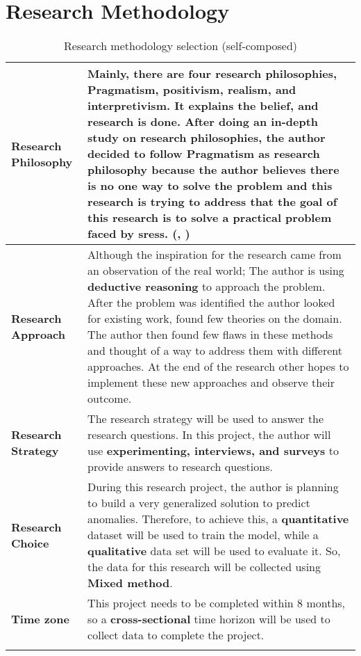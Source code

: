 \section{Research Methodology} \label{sec:methodology}


\begin{longtable}{|p{35mm}|p{125mm}|}
\hline
  \textbf{Research Philosophy} & 
  Mainly, there are four research philosophies, Pragmatism, positivism, realism, and interpretivism. It explains the belief, and research is done. After doing an in-depth study on research philosophies, the author decided to follow \textbf{Pragmatism} as research philosophy because the author believes there is no one way to solve the problem and this research is trying to address that the goal of this research is to solve a practical problem faced by \acp{sres}. (\cite{1Philoso75:online}, \cite{Pragmati87:online})
  \\ \hline
  
  \textbf{Research Approach} & 
  Although the inspiration for the research came from an observation of the real world; The author is using \textbf{deductive reasoning} to approach the problem. After the problem was identified the author looked for existing work, found few theories on the domain. The author then found few flaws in these methods and thought of a way to address them with different approaches. At the end of the research other hopes to implement these new approaches and observe their outcome.
  \\ \hline
  
  \textbf{Research Strategy} & 
  The research strategy will be used to answer the research questions. In this project, the author will use \textbf{experimenting, interviews, and surveys} to provide answers to research questions.
  \\ \hline
  
  \textbf{Research Choice} & 
  During this research project, the author is planning to build a very generalized solution to predict anomalies.  Therefore, to achieve this, a \textbf{quantitative} dataset will be used to train the model, while a \textbf{qualitative} data set will be used to evaluate it. So, the data for this research will be collected using \textbf{Mixed method}.
  \\ \hline
  
  \textbf{Time zone} & 
  This project needs to be completed within 8 months, so a \textbf{cross-sectional} time horizon will be used to collect data to complete the project.
  \\ \hline
  \caption{Research methodology selection (self-composed)}
\end{longtable}
